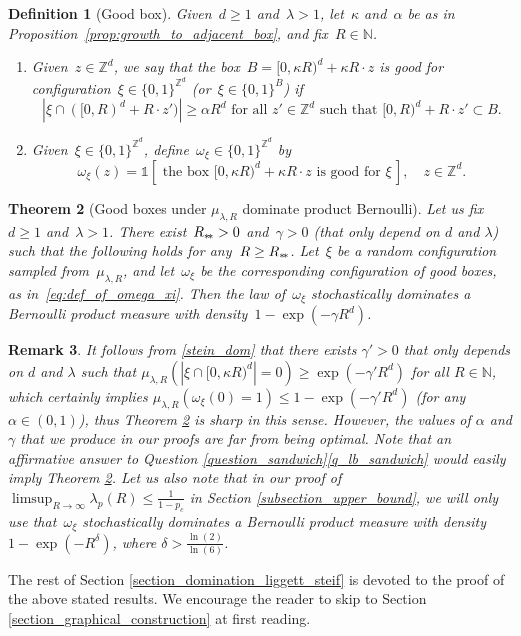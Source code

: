 \documentclass[a4paper,12pt]{article}
\newtheorem  {theorem}       {Theorem}[section]
\newtheorem  {definition}    [theorem]{Definition}
\newtheorem  {remark}        [theorem]{Remark}
\newcommand{\Z}{\mathbb{Z}}
\newcommand{\sstar}{* \hspace{-.05cm} *}
\begin{document}
\begin{definition}[Good box]\label{def:good_boxes}
Given~$d \geq 1$ and~$\lambda > 1$, let~$\kappa$ and~$\alpha$ be as in Proposition~\ref{prop:growth_to_adjacent_box}, and fix~$R \in \mathbb{N}$.
\begin{enumerate}
\item Given~$z \in \Z^d$, we say that the box~$B= [0,\kappa R)^d  + \kappa R \cdot z$ is \emph{good} for configuration~$\xi \in \{0,1\}^{\Z^d}$ (or~$\xi \in \{0,1\}^B$) if
$$
|\xi \cap ([0,R)^d+ R  \cdot z' )| \geq \alpha R^d \text{ for all } z' \in \mathbb{Z}^d \text{ such that } [0,R)^d +R \cdot z' \subset B.
$$
\item Given~$\xi \in \{0,1\}^{\Z^d}$, define~$\omega_\xi \in \{0,1\}^{\Z^d}$ by
\begin{equation} \label{eq:def_of_omega_xi}
\omega_\xi(z) = \mathds{1}\left[\text{ the box }[0,\kappa R)^d + \kappa R\cdot  z \text{ is good for } \xi \,  \right],\quad z \in \mathbb{Z}^d.
\end{equation}
\end{enumerate}
\end{definition}
\begin{theorem}[Good boxes under $\mu_{\lambda,R}$ dominate product Bernoulli]\label{thm:density_good_boxes}
Let us fix~$d \geq 1$ and~$\lambda > 1$. There exist~$R_{\sstar} >0$ and~$\gamma > 0$ (that only depend on $d$ and $\lambda$) such that the following holds for any~$R \ge R_{\sstar}$. Let~$\xi$ be a random configuration sampled from~${\mu}_{\lambda,R}$, and let~$\omega_\xi$ be the corresponding configuration of good boxes, as in~\eqref{eq:def_of_omega_xi}. Then the law of~$\omega_\xi$ stochastically dominates a Bernoulli product  measure with density~$1 - \exp(-\gamma R^d)$.
\end{theorem}

\begin{remark} It follows from \eqref{stein_dom} that there exists $\gamma'>0$ that only depends on $d$ and $\lambda$ such that
 $\mu_{\lambda,R}( |\xi \cap [0,\kappa R)^d |=0 ) \geq \exp(-\gamma' R^d)$ for all $R \in \mathbb{N}$, which certainly implies
	$\mu_{\lambda,R}( \omega_\xi(0)=1 ) \leq 1- \exp(-\gamma' R^d)$ (for any~$\alpha \in (0,1)$),
  thus Theorem \ref{thm:density_good_boxes} is sharp in this sense. However,  the values of  $\alpha$ and $\gamma$ that we produce in our proofs
   are far from being optimal. Note that an affirmative answer to Question \ref{question_sandwich}\eqref{q_lb_sandwich} would easily imply Theorem \ref{thm:density_good_boxes}.
       Let us also note that in our proof of
       $\limsup_{R \to \infty } \lambda_p(R) \leq \frac{1}{1-p_c}$ in Section \ref{subsection_upper_bound}, we will only use that~$\omega_\xi$ stochastically dominates a Bernoulli product
    measure with density~$1 - \exp(-R^{\delta})$, where $\delta >\frac{\ln(2)}{\ln(6)}$.
\end{remark}
The rest of Section \ref{section_domination_liggett_steif} is devoted to the proof of the above stated results.
We encourage the reader to skip to Section \ref{section_graphical_construction} at first reading.
\end{document}
